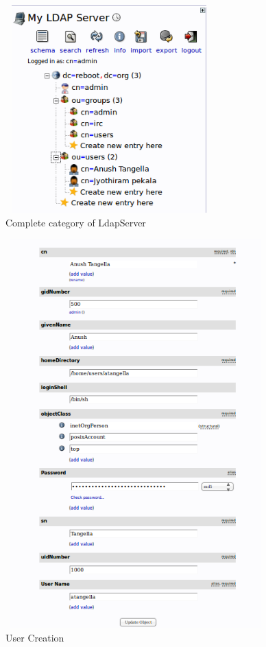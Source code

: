 \documentclass[12pt]{report}
\begin{document}
		\begin{figure}[H]
		\begin{center}
		\includegraphics[width=8cm,height=8cm]{Screens/serversidebar.png}
		\caption{Complete category of LdapServer \label{fig: Complete category of LdapServer}}
		\end{center}
		\end{figure}
	
		\begin{figure}[H]
		\begin{center}
		\includegraphics[width=10cm,height=15cm]{Screens/UserCreation.png}
		\caption{User Creation \label{fig: User Creation}}
		\end{center}
		\end{figure}
\end{document}
